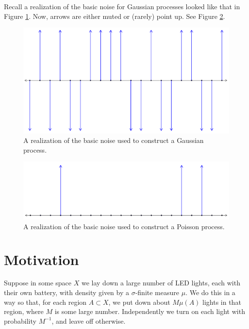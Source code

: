 \documentclass[../../../Master/AppliedStochastics.tex]{subfiles}
\author{Matt}
\date{08 October 2018}
\begin{document}
%


\makelecture


Recall a realization of the basic noise for Gaussian processes looked like that 
in Figure \ref{fig:gaussnoise}. Now, arrows are either muted or (rarely) point 
up. See Figure \ref{fig:poisnoise}.
\begin{figure}
	\centering
	\includegraphics[width=0.9\linewidth]{gauss_noise}
	\caption{A realization of the basic noise used to construct a Gaussian 
	process.}
	\label{fig:gaussnoise}
\end{figure}
\begin{figure}
	\centering
	\includegraphics[width=0.9\linewidth]{pois_noise}
	\caption{A realization of the basic noise used to construct a Poisson 
	process.}
	\label{fig:poisnoise}
\end{figure}

\section{Motivation}
Suppose in some space $X$ we lay down a large number of LED lights, each with 
their own battery, with density given by a $\sigma$-finite measure $\mu$. We do 
this in a way so that, for each region $A\subset X$, we put down about 
$M\mu(A)$ lights in that region, where $M$ is some large number. Independently 
we turn on each light with probability $M^{-1}$, and leave off otherwise.
\end{document}
